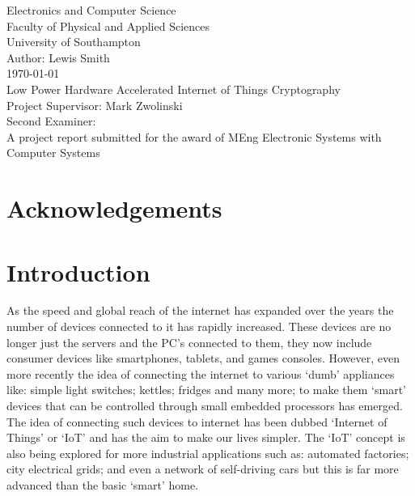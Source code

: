 \documentclass[12pt,twoside,a4paper]{report}
\begin{document}
    
	\begin{titlepage}
	\begin{center}
		\Huge
		Electronics and Computer Science
		\\Faculty of Physical and Applied Sciences
		\\University of Southampton
		\Large
		\\[4cm]Author: Lewis Smith
		\\[1cm]\today
		\\[2cm]Low Power Hardware Accelerated Internet of Things Cryptography
		\\[4cm]Project Supervisor: Mark Zwolinski
		\\Second Examiner:
		\\[4cm]A project report submitted for the award of MEng Electronic Systems with Computer Systems
        
	\end{center}
	\end{titlepage}
	\thispagestyle{empty}
	\cleardoublepage
    
	\begin{abstract}
    
    
	\end{abstract}
    
	\tableofcontents
    
	\chapter*{Acknowledgements}
    
	\chapter{Introduction}
	\label{chapter:intro}
	As the speed and global reach of the internet has expanded over the years the number of devices connected to it has rapidly increased. These devices are no longer just the servers and the PC's connected to them, they now include consumer devices like smartphones, tablets, and games consoles. However, even more recently the idea of connecting the internet to various `dumb' appliances like: simple light switches; kettles; fridges and many more; to make them `smart' devices that can be controlled through small embedded processors has emerged. The idea of connecting such devices to internet has been dubbed `Internet of Things' or `IoT' and has the aim to make our lives simpler. The `IoT' concept is also being explored for more industrial applications such as: automated factories; city electrical grids; and even a network of self-driving cars\cite{Hegde} but this is far more advanced than the basic `smart' home.
    
\end{document}
